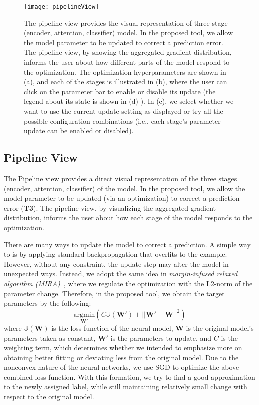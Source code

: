 \begin{figure}[htbp]
\centering
\vspace{-2mm}
 \texttt{[image: pipelineView]}
 \caption{
 The pipeline view provides the visual representation of three-stage (encoder, attention, classifier) model. In the proposed tool, we allow the model parameter to be updated to correct a prediction error. The pipeline view, by showing the aggregated gradient distribution, informs the user about how different parts of the model respond to the optimization.
 The optimization hyperparameters are shown in (a), and each of the stages is illustrated in (b), where the user can click on the parameter bar to enable or disable its update (the legend about its state is shown in (d) ). In (c), we select whether we want to use the current update setting as displayed or try all the possible configuration combinations (i.e., each stage's parameter update can be enabled or disabled).
 }
\label{fig:pipelineView}
\end{figure}

\subsection{Pipeline View}
\label{sec:pipeline}
The Pipeline view provides a direct visual representation of the three stages (encoder, attention, classifier) of the model. In the proposed tool, we allow the model parameter to be updated (via an optimization) to correct a prediction error (\textbf{T3}). The pipeline view, by visualizing the aggregated gradient distribution, informs the user about how each stage of the model responds to the optimization.

There are many ways to update the model to correct a prediction. A simple way to is by applying standard backpropagation that overfits to the example. However, without any constraint, the update step may alter the model in unexpected ways.
Instead, we adopt the same idea in \emph{margin-infused relaxed algorithm (MIRA)}~\cite{CrammerSinger2003}, where we regulate the optimization with the L2-norm of the parameter change. Therefore, in the proposed tool, we obtain the target parameters by the following:
\begin{equation}
\underset{\mathbf{W}'}{\mathrm{argmin}}( C \mathbb{J}(\mathbf{W}') + ||\mathbf{W}' - \mathbf{W}||^2)
\end{equation}
where $\mathbb{J}(\mathbf{W})$ is the loss function of the neural model, $\mathbf{W}$ is the original model's parameters taken as constant, $\mathbf{W}'$ is the parameters to update, and $C$ is the weighting term, which determines whether we intended to emphasize more on obtaining better fitting or deviating less from the original model. Due to the nonconvex nature of the neural networks, we use SGD to optimize the above combined loss function.
%
With this formation, we try to find a good approximation to the newly assigned label, while still maintaining relatively small change with respect to the original model.

